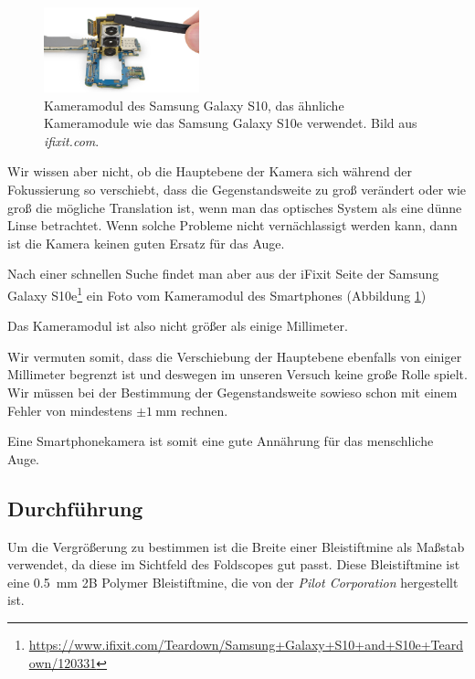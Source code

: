 		\begin{figure}
			\centering
			\vspace{-5pt}
			\includegraphics[width=0.4\textwidth]{images/camera.jpg}
			\caption{Kameramodul des Samsung Galaxy S10, das ähnliche Kameramodule wie das Samsung Galaxy S10e verwendet. Bild aus \textit{ifixit.com}.}
			\vspace{5pt}
			\label{fig:ifixit}
			\vspace{-20pt}
		\end{figure}
		Wir wissen aber nicht, ob die Hauptebene der Kamera sich während der Fokussierung so verschiebt, dass die Gegenstandsweite zu groß verändert oder wie groß die mögliche Translation ist, wenn man das optisches System als eine dünne Linse betrachtet. Wenn solche Probleme nicht vernächlassigt werden kann, dann ist die Kamera keinen guten Ersatz für das Auge.
		
		Nach einer schnellen Suche findet man aber aus der iFixit Seite der Samsung Galaxy S10e\footnote{\url{https://www.ifixit.com/Teardown/Samsung+Galaxy+S10+and+S10e+Teardown/120331}} ein Foto vom Kameramodul des Smartphones (Abbildung \ref{fig:ifixit})
		
		Das Kameramodul ist also nicht größer als einige Millimeter. 

		Wir vermuten somit, dass die Verschiebung der Hauptebene ebenfalls von einiger Millimeter begrenzt ist und deswegen im unseren Versuch keine große Rolle spielt. Wir müssen bei der Bestimmung der Gegenstandsweite sowieso schon mit einem Fehler von mindestens $\pm \SI{1}{\milli\meter}$ rechnen. 

		Eine Smartphonekamera ist somit eine gute Annährung für das menschliche Auge.
	\subsection{Durchführung}
		Um die Vergrößerung zu bestimmen ist die Breite einer Bleistiftmine als Maßstab verwendet, da diese im Sichtfeld des Foldscopes gut passt. Diese Bleistiftmine ist eine \SI{0.5}{\milli\meter} 2B Polymer Bleistiftmine, die von der \textit{Pilot Corporation} hergestellt ist. 

